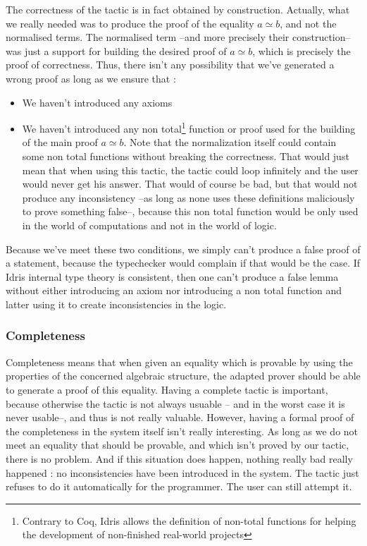 The correctness of the tactic is in fact obtained by construction. Actually, what we really needed was to produce the proof of the equality $a \simeq b$, and not the normalised terms. The normalised term --and more precisely their construction-- was just a support for building the desired proof of $a \simeq b$, which is precisely the proof of correctness. Thus, there isn't any possibility that we've generated a wrong proof as long as we ensure that :
\begin{itemize}
\item We haven't introduced any axioms
\item We haven't introduced any non total\footnote{Contrary to Coq, Idris allows the definition of non-total functions for helping the development of non-finished real-world projects} function or proof used for the building of the main proof $a \simeq b$. Note that the normalization itself could contain some non total functions without breaking the correctness. That would just mean that when using this tactic, the tactic could loop infinitely and the user would never get his answer. That would of course be bad, but that would not produce any inconsistency --as long as none uses these definitions maliciously to prove something false--, because this non total function would be only used in the world of computations and not in the world of logic.
\end{itemize}

Because we've meet these two conditions, we simply can't produce a false proof of a statement, because the typechecker would complain if that would be the case. If Idris internal type theory is consistent, then one can't produce a false lemma without either introducing an axiom nor introducing a non total function and latter using it to create inconsistencies in the logic.

		
		\subsubsection{Completeness}
		
Completeness means that when given an equality which is provable by using the properties of the concerned algebraic structure, the adapted prover should be able to generate a proof of this equality. Having a complete tactic is important, because otherwise the tactic is not always usuable -- and in the worst case it is never usable--, and thus is not really valuable. However, having a formal proof of the completeness in the system itself isn't really interesting. As long as we do not meet an equality that should be provable, and which isn't proved by our tactic, there is no problem. And if this situation does happen, nothing really bad really happened : no inconsistencies have been introduced in the system. The tactic just refuses to do it automatically for the programmer. The user can still attempt it. \\


